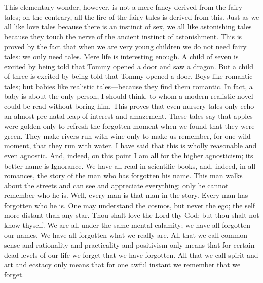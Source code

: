 This elementary wonder, however, is not a mere fancy derived from the fairy tales; on the contrary, all the fire of the fairy tales is derived from this. Just as we all like love tales because there is an instinct of sex, we all like astonishing tales because they touch the nerve of the ancient instinct of astonishment. This is proved by the fact that when we are very young children we do not need fairy tales: we only need tales. Mere life is interesting enough. A child of seven is excited by being told that Tommy opened a door and saw a dragon. But a child of three is excited by being told that Tommy opened a door. Boys like romantic tales; but babies like realistic tales—because they find them romantic. In fact, a baby is about the only person, I should think, to whom a modern realistic novel could be read without boring him. This proves that even nursery tales only echo an almost pre-natal leap of interest and amazement. These tales say that apples were golden only to refresh the forgotten moment when we found that they were green. They make rivers run with wine only to make us remember, for one wild moment, that they run with water. I have said that this is wholly reasonable and even agnostic. And, indeed, on this point I am all for the higher agnosticism; its better name is Ignorance. We have all read in scientific books, and, indeed, in all romances, the story of the man who has forgotten his name. This man walks about the streets and can see and appreciate everything; only he cannot remember who he is. Well, every man is that man in the story. Every man has forgotten who he is. One may understand the cosmos, but never the ego; the self more distant than any star. Thou shalt love the Lord thy God; but thou shalt not know thyself. We are all under the same mental calamity; we have all forgotten our names. We have all forgotten what we really are. All that we call common sense and rationality and practicality and positivism only means that for certain dead levels of our life we forget that we have forgotten. All that we call spirit and art and ecstacy only means that for one awful instant we remember that we forget.

